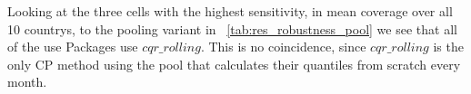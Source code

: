 Looking at the three cells with the highest sensitivity, in mean coverage over all 10 countrys, to the pooling variant in ~\ref{tab:res_robustness_pool} we see that all of the use Packages use $cqr\_rolling$. This is no coincidence, since $cqr\_rolling$ is the only CP method using the pool that calculates their quantiles from scratch every month. \\

